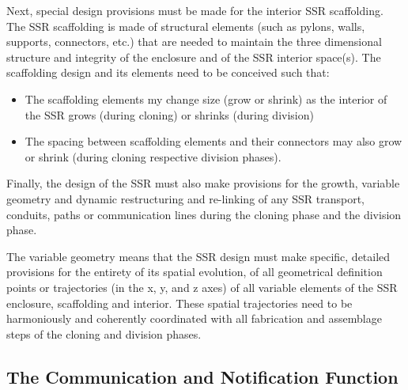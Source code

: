 Next, special design provisions must be made for the interior SSR
scaffolding. The SSR scaffolding is made of structural
elements (such as pylons, walls, supports, connectors, etc.) that are needed to
maintain the three dimensional structure and integrity of the enclosure
and of the SSR interior space(s). The scaffolding design and its
elements need to be conceived such that:

\begin{itemize}
\item The scaffolding elements my change size (grow or shrink) as the
interior of the SSR grows (during cloning) or shrinks (during division)
\item The spacing between scaffolding elements and their connectors may
also grow or shrink (during cloning respective division phases).
\end{itemize}

Finally, the design of the SSR must also make provisions for the growth,
variable geometry and dynamic restructuring and re-linking of any SSR
transport, conduits, paths or communication lines during the cloning
phase and the division phase.

The variable geometry means that the SSR design must make specific,
detailed provisions for the entirety of its spatial evolution, of all geometrical
definition points or trajectories (in the x, y, and z axes) of all variable
elements of the SSR enclosure, scaffolding and interior. These spatial
trajectories need to be harmoniously and coherently coordinated with
all fabrication and assemblage steps of the cloning and division
phases.

\subsection[The Communication and Notification Function]{The
Communication and Notification Function}

